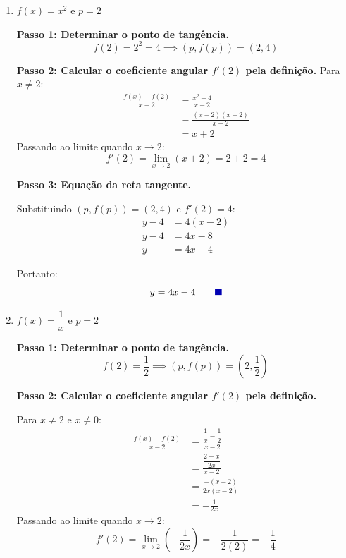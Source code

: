 \documentclass[12pt,a4paper]{article}
\newcommand{\qedsymbolmath}{\tag*{\textcolor{blue!70!black}{\rule{1.6ex}{1.6ex}}}}
\begin{document}
\begin{enumerate}
    \renewcommand{\theenumi}{\alph{enumi}}
    \renewcommand{\labelenumi}{\theenumi)}
    
    \item $f(x) = x^2$ e $p = 2$
    
    \textbf{Passo 1: Determinar o ponto de tangência.}
    \[
    f(2) = 2^2 = 4 \implies (p, f(p)) = (2, 4)
    \]

    \textbf{Passo 2: Calcular o coeficiente angular $f'(2)$ pela definição.}
    Para $x \neq 2$:
    \begin{align*}
        \frac{f(x) - f(2)}{x - 2} &= \frac{x^2 - 4}{x - 2} \\[0.25cm]
        &= \frac{(x - 2)(x + 2)}{x - 2} \\[0.25cm]
        &= x + 2
    \end{align*}
    Passando ao limite quando $x \to 2$:
    \[
    f'(2) = \lim_{x \to 2} (x + 2) = 2 + 2 = 4
    \]

    \textbf{Passo 3: Equação da reta tangente.}

    Substituindo $(p, f(p)) = (2, 4)$ e $f'(2) = 4$:
    \begin{align*}
        y - 4 &= 4(x - 2) \\[0.25cm]
        y - 4 &= 4x - 8 \\[0.25cm]
        y &= 4x - 4
    \end{align*}

    Portanto:
    \begin{equation*}
        y = 4x - 4 \qedsymbolmath
    \end{equation*}

    \item $f(x) = \dfrac{1}{x}$ e $p = 2$
    
    \textbf{Passo 1: Determinar o ponto de tangência.}
    \[
    f(2) = \frac{1}{2} \implies (p, f(p)) = \left(2, \frac{1}{2}\right)
    \]

    \textbf{Passo 2: Calcular o coeficiente angular $f'(2)$ pela definição.}

    Para $x \neq 2$ e $x \neq 0$:
    \begin{align*}
        \frac{f(x) - f(2)}{x - 2} &= \frac{\dfrac{1}{x} - \dfrac{1}{2}}{x - 2} \\[0.25cm]
        &= \frac{\dfrac{2 - x}{2x}}{x - 2} \\[0.25cm]
        &= \frac{-(x - 2)}{2x(x - 2)} \\[0.25cm]
        &= -\frac{1}{2x}
    \end{align*}
    Passando ao limite quando $x \to 2$:
    \[
    f'(2) = \lim_{x \to 2} \left(-\frac{1}{2x}\right) = -\frac{1}{2(2)} = -\frac{1}{4}
    \]


\end{enumerate}
\end{document}
